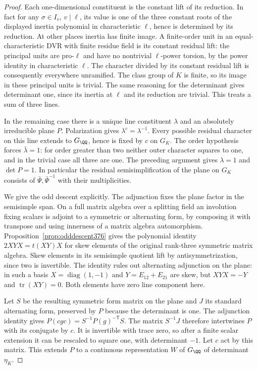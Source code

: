 \documentclass[a4paper,11pt]{article}
\theoremstyle{definition}
\theoremstyle{remark}
\numberwithin{equation}{section}
\begin{document}
\begin{proof}
Each one-dimensional constituent is the constant lift of its
reduction. In fact for any \(\sigma\in I_v\), \(v\mid\ell\),
its value is one of the three constant roots of the displayed
inertia polynomial in characteristic \(\ell\), hence is
determined by its reduction. At other places inertia has
finite image. A finite-order unit in an equal-characteristic
DVR with finite residue field is its constant residual lift:
the principal units are pro-\(\ell\) and have no nontrivial
\(\ell\)-power torsion, by the power identity in characteristic
\(\ell\). The character divided by its constant residual lift
is consequently everywhere unramified. The class group of
\(K\) is finite, so its image in these principal units is
trivial. The same reasoning for the determinant gives
determinant one, since its inertia at \(\ell\) and its
reduction are trivial. This treats a sum of three lines.

In the remaining case there is a unique line constituent
\(\lambda\) and an absolutely irreducible plane \(P\).
Polarization gives \(\lambda^c=\lambda^{-1}\).
Every possible residual character on this line extends to
\(G_\QQ\), hence is fixed by \(c\) on \(G_K\). The order
hypothesis forces \(\bar\lambda=1\): for order greater
than two neither outer character squares to one, and in
the trivial case all three are one. The preceding argument
gives \(\lambda=1\) and \(\det P=1\). In particular the
residual semisimplification of the plane on \(G_K\) consists
of \(\bar\Psi,\bar\Psi^{-1}\) with their multiplicities.

We give the odd descent explicitly. The adjunction fixes the
plane factor in the semisimple span. On a full matrix algebra
over a splitting field an involution fixing scalars is adjoint
to a symmetric or alternating form, by composing it with
transpose and using innerness of a matrix algebra automorphism.
Proposition~\ref{prop:odddescent376} gives the polynomial
identity \(2XYX=t(XY)X\) for skew elements of the original
rank-three symmetric matrix algebra. Skew elements in its
semisimple quotient lift by antisymmetrization, since two
is invertible. The identity rules out alternating adjunction
on the plane: in such a basis \(X=\operatorname{diag}(1,-1)\)
and \(Y=E_{12}+E_{21}\) are skew, but \(XYX=-Y\) and
\(\operatorname{tr}(XY)=0\). Both elements have zero line
component here.

Let \(S\) be the resulting symmetric form matrix on the plane
and \(J\) its standard alternating form, preserved by \(P\)
because the determinant is one. The adjunction identity
gives \(P(cgc)=S^{-1}P(g)^{-{\mathsf T}}S\).
The matrix \(S^{-1}J\) therefore intertwines \(P\) with its
conjugate by \(c\). It is invertible with trace zero, so
after a finite scalar extension it can be rescaled to square
one, with determinant \(-1\). Let \(c\) act by this matrix.
This extends \(P\) to a continuous representation \(W\)
of \(G_\QQ\) of determinant \(\eta_K\).


\end{proof}
\end{document}
